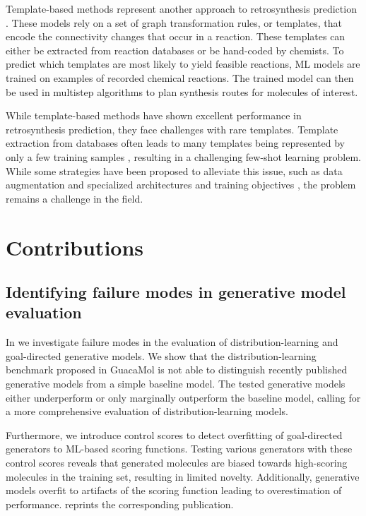 Template-based methods represent another approach to retrosynthesis prediction
\citep{seglerNeuralSymbolicMachineLearning2017,seglerPlanningChemicalSyntheses2018,daiRetrosynthesisPredictionConditional2019,sunUnderstandingRetrosynthesisEnergybased2021}.
These models rely on a set of graph transformation rules, or templates, that encode the connectivity
changes that occur in a reaction. These templates can either be extracted from reaction databases or
be hand-coded by chemists. To predict which templates are most likely to yield feasible reactions,
\ac{ML} models are trained on examples of recorded chemical reactions. The trained model can then be
used in multistep algorithms to plan synthesis routes for molecules of interest.

While template-based methods have shown excellent performance in retrosynthesis prediction, they
face challenges with rare templates. Template extraction from databases often leads to many
templates being represented by only a few training samples
\citep{fortunatoDataAugmentationPretraining2020}, resulting in a challenging few-shot learning
problem. While some strategies have been proposed to alleviate this issue, such as data augmentation
\citep{fortunatoDataAugmentationPretraining2020} and specialized architectures and training
objectives \citep{daiRetrosynthesisPredictionConditional2019}, the problem remains a challenge in
the field.

\section{Contributions\label{sec:contributions}}
\subsection{Identifying failure modes in generative model evaluation}
In \citet{renzFailureModesMolecule2019} we investigate failure modes in the evaluation of
distribution-learning and goal-directed generative models. We show that the distribution-learning
benchmark proposed in GuacaMol \citep{brownGuacaMolBenchmarkingModels2019} is not able to
distinguish recently published generative models from a simple baseline model. The tested generative
models either underperform or only marginally outperform the baseline model, calling for a more
comprehensive evaluation of distribution-learning models.

Furthermore, we introduce control scores to detect overfitting of goal-directed generators to
\ac{ML}-based scoring functions. Testing various generators with these control scores reveals that
generated molecules are biased towards high-scoring molecules in the training set, resulting in
limited novelty. Additionally, generative models overfit to artifacts of the scoring function
leading to overestimation of performance.  reprints the corresponding
publication.


